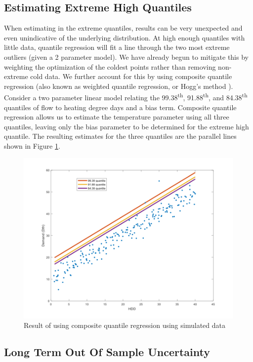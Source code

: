 \documentclass{article}
\begin{document}
\subsection{Estimating Extreme High Quantiles}

When estimating in the extreme quantiles, results can be very unexpected and even unindicative of the underlying distribution. At high enough quantiles with little data, quantile regression will fit a line through the two most extreme outliers (given a 2 parameter model). We have already begun to mitigate this by weighting the optimization of the coldest points rather than removing non-extreme cold data. We further account for this by using composite quantile regression (also known as weighted quantile regression, or Hogg's method \cite{koenker2004quantile}). Consider a two parameter linear model relating the 99.38\textsuperscript{th}, 91.88\textsuperscript{th}, and 84.38\textsuperscript{th} quantiles of flow to heating degree days and a bias term. Composite quantile regression allows us to estimate the temperature parameter using all three quantiles, leaving only the bias parameter to be determined for the extreme high quantile. The resulting estimates for the three quantiles are the parallel lines shown in Figure \ref{composite}.

\begin{figure}
	\includegraphics[scale=0.7]{composite.png}
	\caption{Result of using composite quantile regression using simulated data}\label{composite}
\end{figure}

\subsection{Long Term Out Of Sample Uncertainty} \label{longterm}
\end{document}

